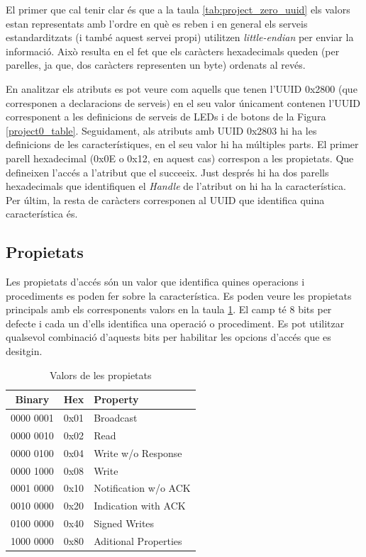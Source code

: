 El primer que cal tenir clar és que a la taula \ref{tab:project_zero_uuid} els valors estan representats amb l'ordre en què es reben i en general els serveis estandarditzats (i també aquest servei propi) utilitzen \textit{little-endian} per enviar la informació.
Això resulta en el fet que els caràcters hexadecimals queden (per parelles, ja que, dos caràcters representen un byte) ordenats al revés.

En analitzar els atributs es pot veure com aquells que tenen l'UUID 0x2800 (que corresponen a declaracions de serveis) en el seu valor únicament contenen l'UUID corresponent a les definicions de serveis de LEDs i de botons de la Figura \ref{project0_table}.
Seguidament, als atributs amb UUID 0x2803 hi ha les definicions de les característiques, en el seu valor hi ha múltiples parts.
El primer parell hexadecimal (0x0E o 0x12, en aquest cas) correspon a les propietats.
Que defineixen l'accés a l'atribut que el succeeix.
Just després hi ha dos parells hexadecimals que identifiquen el \textit{Handle} de l'atribut on hi ha la característica.
Per últim, la resta de caràcters corresponen al UUID que identifica quina característica és.

\subsection{Propietats}
\label{sec:properties}
Les propietats d'accés són un valor que identifica quines operacions i procediments es poden fer sobre la característica.
Es poden veure les propietats principals amb els corresponents valors en la taula \ref{properties}.
El camp té 8 bits per defecte i cada un d'ells identifica una operació o procediment.
Es pot utilitzar qualsevol combinació d'aquests bits  per habilitar les opcions d'accés que es desitgin.

\begin{table}[h]
	\begin{center}
		\begin{tabular}{|c|c|l|}
			\hline
			Binary	&	Hex		&	Property	\\	\hline
			0000 0001	&	0x01	&	Broadcast\\	\hline
			0000 0010	&	0x02	&	Read	\\	\hline
			0000 0100	&	0x04	&	Write w/o Response	\\	\hline
			0000 1000	&	0x08	&	Write	\\	\hline
			0001 0000	&	0x10	&	Notification w/o ACK	\\	\hline
			0010 0000	&	0x20	&	Indication with ACK	\\	\hline
			0100 0000	&	0x40	&	Signed Writes	\\	\hline
			1000 0000	&	0x80	&	Aditional Properties	\\	\hline
		\end{tabular}		
	\end{center}
\caption{Valors de les propietats}
\label{properties}
\end{table}

